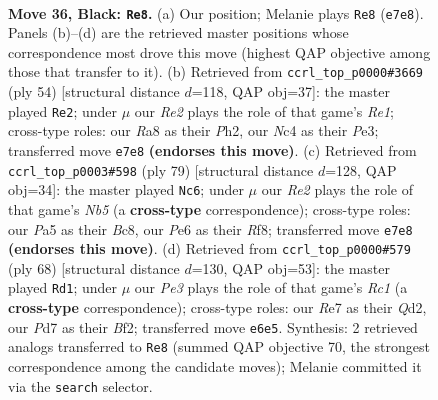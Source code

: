 \documentclass[11pt]{article}
\begin{document}
\clearpage

\begin{figure}[p]\centering
\begin{subfigure}{0.46\textwidth}\centering
\resizebox{\linewidth}{!}{%
\newchessgame
\chessboard[
  setfen={r1b2k2/3pr1bp/1q2p3/p4pBB/P1np3P/5NQ1/1P3PK1/RN1R4 b - - 3 36},
  showmover=false,
  pgfstyle=straightmove, color=movearrow, markmove={e7-e8}
]}
\caption{}
\end{subfigure}\hfill
\begin{subfigure}{0.46\textwidth}\centering
\resizebox{\linewidth}{!}{%
\newchessgame
\chessboard[
  setfen={q2rn1k1/1b3pp1/1p3n1p/p7/PbNP1N2/4P1PB/1B3P1P/3QR1K1 w - - 1 28},
  showmover=false,
  pgfstyle=straightmove, color=movearrow, markmove={e1-e2}
]}
\caption{}
\end{subfigure}
\\[4pt]
\begin{subfigure}{0.46\textwidth}\centering
\resizebox{\linewidth}{!}{%
\newchessgame
\chessboard[
  setfen={1kb2r2/1pb5/1q2pr2/p2pN3/Pn3P1p/2Q2B1P/1PP1N1P1/3RR2K b - - 14 40},
  showmover=false,
  pgfstyle=straightmove, color=movearrow, markmove={b4-c6}
]}
\caption{}
\end{subfigure}\hfill
\begin{subfigure}{0.46\textwidth}\centering
\resizebox{\linewidth}{!}{%
\newchessgame
\chessboard[
  setfen={rr2bnk1/2p3p1/2nq3p/1pN1pP2/P3P1PP/7K/3Q1BB1/R1R5 w - - 1 35},
  showmover=false,
  pgfstyle=straightmove, color=movearrow, markmove={c1-d1}
]}
\caption{}
\end{subfigure}
\caption{\textbf{Move 36, Black: \texttt{Re8}.} (a) Our position; Melanie plays \texttt{Re8} (\texttt{e7e8}). Panels (b)--(d) are the retrieved master positions whose correspondence most drove this move (highest QAP objective among those that transfer to it). (b) Retrieved from \texttt{ccrl\_top\_p0000\#3669} (ply 54) [structural distance $d$=118, QAP obj=37]: the master played \texttt{Re2}; under $\mu$ our \emph{Re2} plays the role of that game's \emph{Re1}; cross-type roles: our \emph{R}a8 as their \emph{P}h2, our \emph{N}c4 as their \emph{P}e3; transferred move \texttt{e7e8} \textbf{(endorses this move)}. (c) Retrieved from \texttt{ccrl\_top\_p0003\#598} (ply 79) [structural distance $d$=128, QAP obj=34]: the master played \texttt{Nc6}; under $\mu$ our \emph{Re2} plays the role of that game's \emph{Nb5} (a \textbf{cross-type} correspondence); cross-type roles: our \emph{P}a5 as their \emph{B}c8, our \emph{P}e6 as their \emph{R}f8; transferred move \texttt{e7e8} \textbf{(endorses this move)}. (d) Retrieved from \texttt{ccrl\_top\_p0000\#579} (ply 68) [structural distance $d$=130, QAP obj=53]: the master played \texttt{Rd1}; under $\mu$ our \emph{Pe3} plays the role of that game's \emph{Rc1} (a \textbf{cross-type} correspondence); cross-type roles: our \emph{R}e7 as their \emph{Q}d2, our \emph{P}d7 as their \emph{B}f2; transferred move \texttt{e6e5}. Synthesis: 2 retrieved analogs transferred to \texttt{Re8} (summed QAP objective 70, the strongest correspondence among the candidate moves); Melanie committed it via the \texttt{search} selector.}
\label{fig:thought-m71}
\end{figure}
\end{document}
